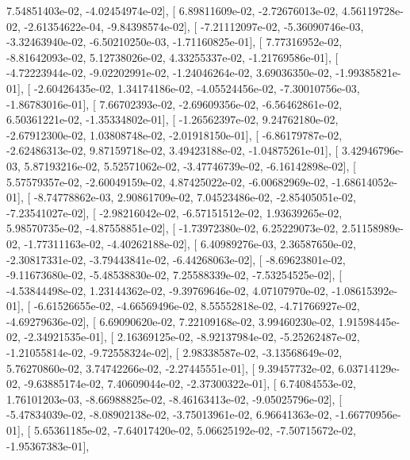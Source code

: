 \documentclass{article}
\begin{document}
          7.54851403e-02,  -4.02454974e-02],
       [  6.89811609e-02,  -2.72676013e-02,   4.56119728e-02,
         -2.61354622e-04,  -9.84398574e-02],
       [ -7.21112097e-02,  -5.36090746e-03,  -3.32463940e-02,
         -6.50210250e-03,  -1.71160825e-01],
       [  7.77316952e-02,  -8.81642093e-02,   5.12738026e-02,
          4.33255337e-02,  -1.21769586e-01],
       [ -4.72223944e-02,  -9.02202991e-02,  -1.24046264e-02,
          3.69036350e-02,  -1.99385821e-01],
       [ -2.60426435e-02,   1.34174186e-02,  -4.05524456e-02,
         -7.30010756e-03,  -1.86783016e-01],
       [  7.66702393e-02,  -2.69609356e-02,  -6.56462861e-02,
          6.50361221e-02,  -1.35334802e-01],
       [ -1.26562397e-02,   9.24762180e-02,  -2.67912300e-02,
          1.03808748e-02,  -2.01918150e-01],
       [ -6.86179787e-02,  -2.62486313e-02,   9.87159718e-02,
          3.49423188e-02,  -1.04875261e-01],
       [  3.42946796e-03,   5.87193216e-02,   5.52571062e-02,
         -3.47746739e-02,  -6.16142898e-02],
       [  5.57579357e-02,  -2.60049159e-02,   4.87425022e-02,
         -6.00682969e-02,  -1.68614052e-01],
       [ -8.74778862e-03,   2.90861709e-02,   7.04523486e-02,
         -2.85405051e-02,  -7.23541027e-02],
       [ -2.98216042e-02,  -6.57151512e-02,   1.93639265e-02,
          5.98570735e-02,  -4.87558851e-02],
       [ -1.73972380e-02,   6.25229073e-02,   2.51158989e-02,
         -1.77311163e-02,  -4.40262188e-02],
       [  6.40989276e-03,   2.36587650e-02,  -2.30817331e-02,
         -3.79443841e-02,  -6.44268063e-02],
       [ -8.69623801e-02,  -9.11673680e-02,  -5.48538830e-02,
          7.25588339e-02,  -7.53254525e-02],
       [ -4.53844498e-02,   1.23144362e-02,  -9.39769646e-02,
          4.07107970e-02,  -1.08615392e-01],
       [ -6.61526655e-02,  -4.66569496e-02,   8.55552818e-02,
         -4.71766927e-02,  -4.69279636e-02],
       [  6.69090620e-02,   7.22109168e-02,   3.99460230e-02,
          1.91598445e-02,  -2.34921535e-01],
       [  2.16369125e-02,  -8.92137984e-02,  -5.25262487e-02,
         -1.21055814e-02,  -9.72558324e-02],
       [  2.98338587e-02,  -3.13568649e-02,   5.76270860e-02,
          3.74742266e-02,  -2.27445551e-01],
       [  9.39457732e-02,   6.03714129e-02,  -9.63885174e-02,
          7.40609044e-02,  -2.37300322e-01],
       [  6.74084553e-02,   1.76101203e-03,  -8.66988825e-02,
         -8.46163413e-02,  -9.05025796e-02],
       [ -5.47834039e-02,  -8.08902138e-02,  -3.75013961e-02,
          6.96641363e-02,  -1.66770956e-01],
       [  5.65361185e-02,  -7.64017420e-02,   5.06625192e-02,
         -7.50715672e-02,  -1.95367383e-01],
\end{document}
